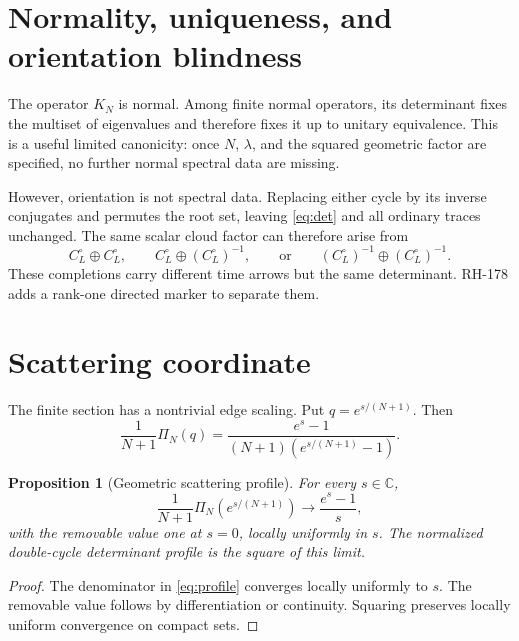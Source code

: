 \documentclass[12pt]{article}
\newtheorem{proposition}[theorem]{Proposition}
\theoremstyle{remark}
\begin{document}
\section{Normality, uniqueness, and orientation blindness}

The operator $K_N$ is normal.  Among finite normal operators, its determinant
fixes the multiset of eigenvalues and therefore fixes it up to unitary
equivalence.  This is a useful limited canonicity: once $N$, $\lambda$, and
the squared geometric factor are specified, no further normal spectral data
are missing.

However, orientation is not spectral data.  Replacing either cycle by its
inverse conjugates and permutes the root set, leaving
\eqref{eq:det} and all ordinary traces unchanged.  The same scalar cloud
factor can therefore arise from
\[
 C_L^\circ\oplus C_L^\circ,
 \qquad
 C_L^\circ\oplus(C_L^\circ)^{-1},
 \qquad\text{or}\qquad
 (C_L^\circ)^{-1}\oplus(C_L^\circ)^{-1}.
\]
These completions carry different time arrows but the same determinant.
RH-178 adds a rank-one directed marker to separate them.

\section{Scattering coordinate}

The finite section has a nontrivial edge scaling.  Put
$q=e^{s/(N+1)}$.  Then
\begin{equation}\label{eq:profile}
 \frac1{N+1}\Pi_N(q)
 =\frac{e^s-1}{(N+1)(e^{s/(N+1)}-1)}.
\end{equation}

\begin{proposition}[Geometric scattering profile]\label{prop:profile}
For every $s\in\mathbb C$,
\begin{equation}\label{eq:limit}
 \frac1{N+1}\Pi_N(e^{s/(N+1)})
 \longrightarrow \frac{e^s-1}{s},
\end{equation}
with the removable value one at $s=0$, locally uniformly in $s$.
The normalized double-cycle determinant profile is the square of this limit.
\end{proposition}

\begin{proof}
The denominator in \eqref{eq:profile} converges locally uniformly to $s$.
The removable value follows by differentiation or continuity.  Squaring
preserves locally uniform convergence on compact sets.
\end{proof}
\end{document}
